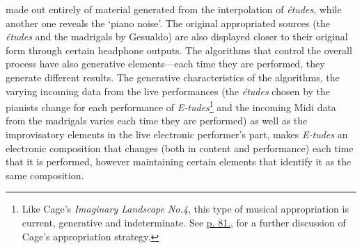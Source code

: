 made out entirely of material generated from the interpolation of \emph{\'{e}tudes}, while another one reveals the `piano noise'. The original appropriated sources (the \emph{\'{e}tudes} and the madrigals by Gesualdo) are also displayed closer to their original form through certain headphone outputs. The algorithms that control the overall process have also generative elements---each time they are performed, they generate different results. The generative characteristics of the algorithms, the varying incoming data from the live performances (the \emph{\'{e}tudes} chosen by the pianists change for each performance of \emph{E-tudes}\footnote{Like Cage's \emph{Imaginary Landscape No.4}, this type of musical appropriation is current, generative and indeterminate. See \hyperlink{landscape4}{p. 81.}, for a further discussion of Cage's appropriation strategy.} and the incoming Midi data from the madrigals varies each time they are performed) as well as the improvisatory elements in the live electronic performer's part, makes \emph{E-tudes} an electronic composition that changes (both in content and performance) each time that it is performed, however maintaining certain elements that identify it as the same composition.

